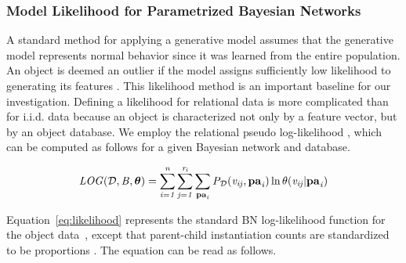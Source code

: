 				\subsubsection{Model Likelihood for Parametrized Bayesian Networks}
				
				
				
				A standard method for applying a generative model assumes that the generative model represents normal behavior since it was learned from the entire population. An object is deemed an outlier if the model assigns sufficiently low likelihood to generating its features \cite{Cansado2008}. This likelihood method is an important baseline for our investigation.
				Defining a likelihood for relational data is more complicated than for i.i.d. data because an object is characterized not only by a feature vector, but by an object  database.
				We employ the relational pseudo log-likelihood \cite{Schulte2011}, which can be computed as follows for a given Bayesian network  and database.
				
				
				\begin{equation} \label{eq:likelihood}
				\it{LOG}(\mathcal{D},B,\boldsymbol{\theta}) =   \sum_{i=1}^{n}\sum_{j=1}^{r_{i}} \sum_{\mathbf{pa}_{i}}P_{\mathcal{D}}(v_{ij},\mathbf{pa}_{i})\ln \theta(v_{ij}|\mathbf{pa}_{i})  
				\end{equation}
				
				
				Equation~\eqref{eq:likelihood} represents the standard BN log-likelihood function for the object  data~\cite{Campos2006}, except that parent-child instantiation counts are standardized to be proportions \cite{Schulte2011}. The equation can be read as follows.
				
